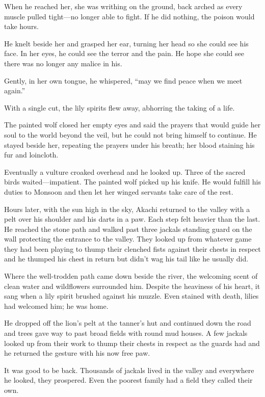 When he reached her, she was writhing on the ground, back arched as every muscle pulled tight---no longer able to fight. If he did nothing, the poison would take hours.

He knelt beside her and grasped her ear, turning her head so she could see his face. In her eyes, he could see the terror and the pain. He hope she could see there was no longer any malice in his.

Gently, in her own tongue, he whispered, ``may we find peace when we meet again.''

With a single cut, the lily spirits flew away, abhorring the taking of a life.

The painted wolf closed her empty eyes and said the prayers that would guide her soul to the world beyond the veil, but he could not bring himself to continue. He stayed beside her, repeating the prayers under his breath; her blood staining his fur and loincloth.

Eventually a vulture croaked overhead and he looked up. Three of the sacred birds waited---impatient. The painted wolf picked up his knife. He would fulfill his duties to Monsoon and then let her winged servants take care of the rest.

\secdiv

\noindent Hours later, with the sun high in the sky, Akachi returned to the valley with a pelt over his shoulder and his darts in a paw. Each step felt heavier than the last. He reached the stone path and walked past three jackals standing guard on the wall protecting the entrance to the valley. They looked up from whatever game they had been playing to thump their clenched fists against their chests in respect and he thumped his chest in return but didn't wag his tail like he usually did.

Where the well-trodden path came down beside the river, the welcoming scent of clean water and wildflowers surrounded him. Despite the heaviness of his heart, it sang when a lily spirit brushed against his muzzle. Even stained with death, lilies had welcomed him; he was home.

He dropped off the lion's pelt at the tanner's hut and continued down the road and trees gave way to past broad fields with round mud houses. A few jackals looked up from their work to thump their chests in respect as the guards had and he returned the gesture with his now free paw.

It was good to be back. Thousands of jackals lived in the valley and everywhere he looked, they prospered. Even the poorest family had a field they called their own.

